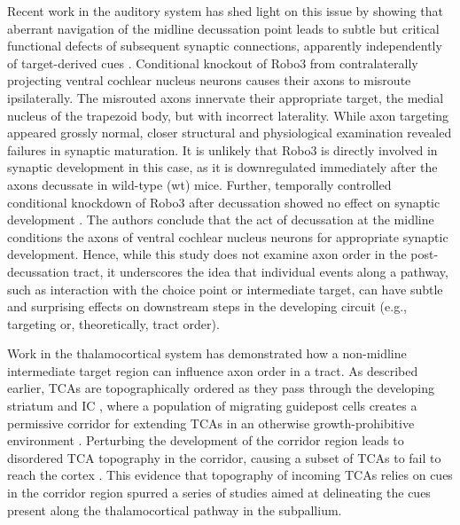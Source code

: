 Recent work in the auditory system has shed light on this issue by showing that aberrant navigation of the midline decussation point leads to subtle but critical functional defects of subsequent synaptic connections, apparently independently of target-derived cues \cite{michalski2013robo3}. 
Conditional knockout of Robo3 from contralaterally projecting ventral cochlear nucleus neurons causes their axons to misroute ipsilaterally. 
The misrouted axons innervate their appropriate target, the medial nucleus of the trapezoid body, but with incorrect laterality. 
While axon targeting appeared grossly normal, closer structural and physiological examination revealed failures in synaptic maturation. 
It is unlikely that Robo3 is directly involved in synaptic development in this case, as it is downregulated immediately after the axons decussate in wild-type (wt) mice. 
Further, temporally controlled conditional knockdown of Robo3 after decussation showed no effect on synaptic development \cite{michalski2013robo3}. 
The authors conclude that the act of decussation at the midline conditions the axons of ventral cochlear nucleus neurons for appropriate synaptic development. 
Hence, while this study does not examine axon order in the post-decussation tract, it underscores the idea that individual events along a pathway, such as interaction with the choice point or intermediate target, can have subtle and surprising effects on downstream steps in the developing circuit (e.g., targeting or, theoretically, tract order). 

Work in the thalamocortical system has demonstrated how a non-midline intermediate target region can influence axon order in a tract. 
As described earlier, TCAs are topographically ordered as they pass through the developing striatum and IC \cite{garel2014inputs}, where a population of migrating guidepost cells creates a permissive corridor for extending TCAs in an otherwise growth-prohibitive environment \cite{bielle2011emergent,lopez2006tangential}. 
Perturbing the development of the corridor region leads to disordered TCA topography in the corridor, causing a subset of TCAs to fail to reach the cortex \cite{garel2002early}. 
This evidence that topography of incoming TCAs relies on cues in the corridor region spurred a series of studies aimed at delineating the cues present along the thalamocortical pathway in the subpallium. 

